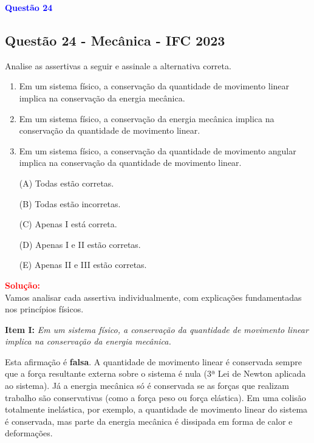 \begin{flushleft}
\textbf{\textcolor{blue}{\Large Quest\~ao 24 }}\\
\noindent
\subsection{Quest\~ao 24 - Mecânica - IFC 2023}
Analise as assertivas a seguir e assinale a alternativa correta.

\begin{enumerate}
    \item Em um sistema físico, a conservação da quantidade de movimento linear implica na conservação da energia mecânica.
    \item Em um sistema físico, a conservação da energia mecânica implica na conservação da quantidade de movimento linear.
    \item Em um sistema físico, a conservação da quantidade de movimento angular implica na conservação da quantidade de movimento linear.
\end{enumerate}

\begin{itemize}
\item[(A)] Todas estão corretas.
\item[(B)] Todas estão incorretas.
\item[(C)] Apenas I está correta.
\item[(D)] Apenas I e II estão corretas.
\item[(E)] Apenas II e III estão corretas.
\end{itemize}

\vspace{0.5cm}

\textcolor{red}{\textbf{Solução:}}\\

Vamos analisar cada assertiva individualmente, com explicações fundamentadas nos princípios físicos.

\vspace{0.3cm}

\textbf{Item I:} \textit{Em um sistema físico, a conservação da quantidade de movimento linear implica na conservação da energia mecânica.}

Esta afirmação é \textbf{falsa}.  
A quantidade de movimento linear é conservada sempre que a força resultante externa sobre o sistema é nula (3ª Lei de Newton aplicada ao sistema).  
Já a energia mecânica só é conservada se as forças que realizam trabalho são conservativas (como a força peso ou força elástica).  
Em uma colisão totalmente inelástica, por exemplo, a quantidade de movimento linear do sistema é conservada, mas parte da energia mecânica é dissipada em forma de calor e deformações.


\end{flushleft}
